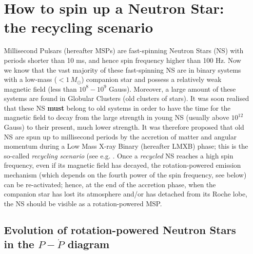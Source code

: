 \documentclass[graybox]{svmult}
\begin{document}
\section{How to spin up a Neutron Star: the recycling scenario}

Millisecond Pulsars (hereafter MSPs) are fast-spinning Neutron Stars (NS) with periods shorter than 10 ms, and hence spin frequency higher than 100 Hz. Now we know that the vast majority of these fast-spinning NS are in binary systems with a low-mass ($< 1\, M_\odot$) companion star and possess a relatively weak magnetic field (less than $10^8-10^9$ Gauss). Moreover, a large amount of these systems are found in Globular Clusters (old clusters of stars). It was soon realised that these NS \textbf{must} belong to old systems in order to have the time for the magnetic field to decay from the large strength in young NS (usually above $10^{12}$ Gauss) to their present, much lower strength. It was therefore proposed that old NS are spun up to millisecond periods by the accretion of matter and angular momentum during a Low Mass X-ray Binary (hereafter LMXB) phase; this is the so-called {\it recycling scenario} (see e.g. \cite{Bhattacharya1991}. Once a {\it recycled} NS reaches a high spin frequency, even if its magnetic field has decayed, the rotation-powered emission mechanism (which depends on the fourth power of the spin frequency, see below) can be re-activated; hence, at the end of the accretion phase, when the companion star has lost its atmosphere and/or has detached from its Roche lobe, the NS should be visible as a rotation-powered MSP. 


\subsection{Evolution of rotation-powered Neutron Stars in the $P - \dot P$ diagram}
\end{document}
